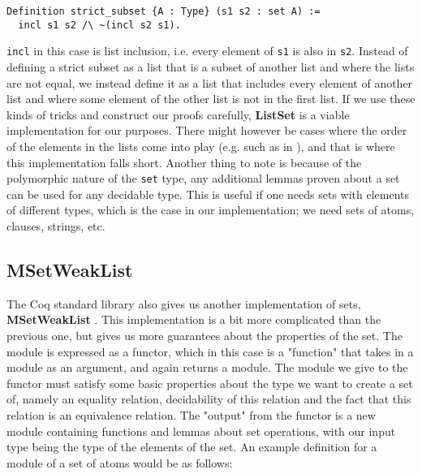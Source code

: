 \begin{minipage}{\linewidth}
\begin{lstlisting}[language=Coq, label={lst:subset_def}, caption={Strict subset relation on lists using \lstinline{incl}}]
Definition strict_subset {A : Type} (s1 s2 : set A) :=
  incl s1 s2 /\ ~(incl s2 s1).
\end{lstlisting}
\end{minipage}

\lstinline{incl} in this case is list inclusion, i.e. every element of \lstinline{s1} is also in \lstinline{s2}.
Instead of defining a strict subset as a list that is a subset of another list and where the lists are not equal,
we instead define it as a list that includes every element of another list and where some element of
the other list is not in the first list.
If we use these kinds of tricks and construct our proofs carefully, \textbf{ListSet} is a viable implementation for our purposes.
There might however be cases where the order of the elements in the lists come into play (e.g. such as in ),
and that is where this implementation falls short.
Another thing to note is because of the polymorphic nature of the \lstinline{set} type, any additional lemmas proven about a set can be
used for any decidable type. This is useful if one needs sets with elements of different types,
which is the case in our implementation; we need sets of atoms, clauses, strings, etc.

\subsection{MSetWeakList}
\label{ssec:msetweaklist}

The Coq standard library also gives us another implementation of sets, \textbf{MSetWeakList} \cite{coqmsetweaklist}.
This implementation is a bit more complicated than the previous one,
but gives us more guarantees about the properties of the set.
The module is expressed as a functor, which in this case is a "function" that takes in a module as an argument, and again returns a module.
The module we give to the functor must satisfy some basic properties about the type we want to create a set of,
namely an equality relation, decidability of this relation and the fact that this relation is an equivalence relation.
The "output" from the functor is a new module containing functions and lemmas about set operations,
with our input type being the type of the elements of the set.
An example definition for a module of a set of atoms would be as follows:

